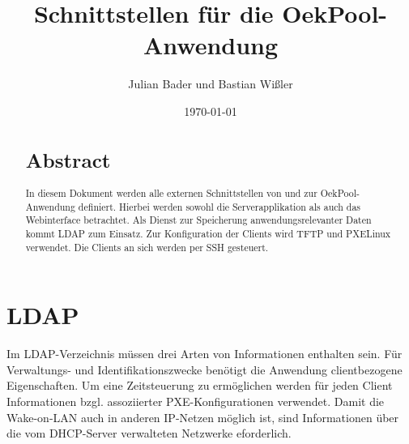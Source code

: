 \documentclass[	
				a4paper, 
				twoside,
				11pt,
				DIV11,
				BCOR12mm,
				bibtotoc, 
				halfparskip, 
				headsepline, 
				pointlessnumbers]{scrartcl}
\title{Schnittstellen für die OekPool-Anwendung}
\author{Julian Bader und Bastian Wißler}
\date{\today}
\begin{document}
\maketitle
\indent
\begin{abstract}
\section*{Abstract}
In diesem Dokument werden alle externen Schnittstellen von und zur OekPool-Anwendung definiert.
Hierbei werden sowohl die Serverapplikation als auch das Webinterface betrachtet.
Als Dienst zur Speicherung anwendungsrelevanter Daten kommt LDAP zum Einsatz.
Zur Konfiguration der Clients wird TFTP und PXELinux verwendet.
Die Clients an sich werden per SSH gesteuert.
\end{abstract}
\newpage

\section{LDAP}
Im LDAP-Verzeichnis müssen drei Arten von Informationen enthalten sein.
Für Verwaltungs- und Identifikationszwecke benötigt die Anwendung clientbezogene Eigenschaften.
Um eine Zeitsteuerung zu ermöglichen werden für jeden Client Informationen bzgl. assoziierter PXE-Konfigurationen verwendet.
Damit die Wake-on-LAN auch in anderen IP-Netzen möglich ist, sind Informationen über die vom DHCP-Server verwalteten Netzwerke eforderlich.
\end{document}
